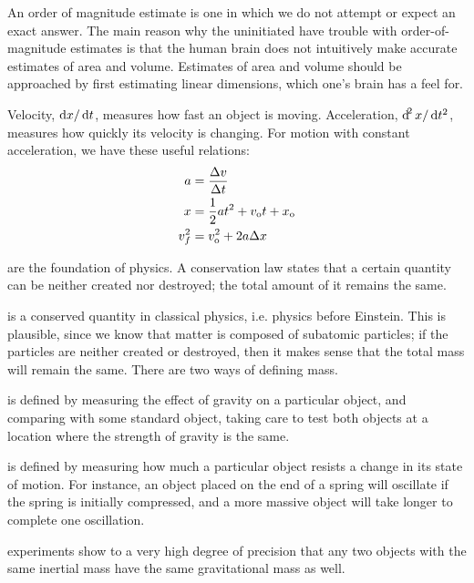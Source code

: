 An order of magnitude estimate is one in which we do not
attempt or expect an exact answer. The main reason why the
uninitiated have trouble with order-of-magnitude estimates
is that the human brain does not intuitively make accurate
estimates of area and volume. Estimates of area and volume
should be approached by first estimating linear dimensions,
which one's brain has a feel for.

Velocity, $\operatorname{d\!} x/\operatorname{d\!} t$, measures how fast an object is
moving. Acceleration, $\operatorname{d\!}^2x/\operatorname{d\!} t^2$, measures how quickly
its velocity is changing. For motion with constant acceleration,
we have these useful relations:
\begin{align*}
  a &= \frac{\Delta v}{\Delta t} \\
  x &=  \frac{1}{2}at^2 + v_{\textup{o}} t + x_{\textup{o}} \\
  v_f^2 &= v_{\textup{o}}^2 + 2 a \Delta x
\end{align*}

	 are the foundation of physics. A conservation law states that
	a certain quantity can be neither created nor destroyed; the total amount of it
	remains the same.
	
	 is a conserved quantity in classical physics, i.e. physics before
	Einstein. This is plausible, since we know that matter is composed of
	subatomic particles; if the particles are neither created or destroyed, then
	it makes sense that the total mass will remain the same.
	There are two ways of defining mass. 
	
	 is defined
	by measuring the effect of gravity on a particular object, and comparing with
	some standard object, taking care to test both objects at a location where the
	strength of gravity is the same.
	
	 is defined by measuring how much a particular object resists a
	change in its state of motion. For instance, an object placed on the end
	of a spring will oscillate if the spring is initially compressed, and
	a more massive object will take longer to complete one oscillation.
	
	\/ experiments show to a very
	high degree of precision that any two objects with the same inertial mass
	have the same gravitational mass as well.
	
